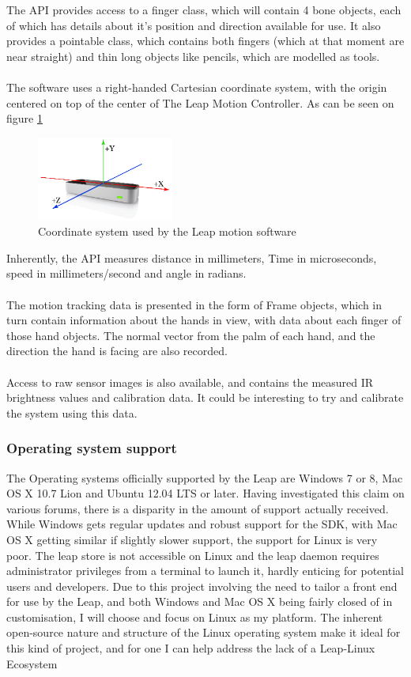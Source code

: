 \documentclass[a4paper]{article}
\begin{document}
The API provides access to a finger class, which will contain 4 bone objects, each of which has details about it's position and direction available for use. It also provides a pointable class, which contains both fingers (which at that moment are near straight) and thin long objects like pencils, which are modelled as tools. \\ \\
The software uses a right-handed Cartesian coordinate system, with the origin centered on top of the center of The Leap Motion Controller. As can be seen on figure \ref{coordinateSystem} 

\begin{figure}[!h]
\centerline{\includegraphics[width=0.4\textwidth]{Leap_Axes.png}}
\caption{Coordinate system used by the Leap motion software
\label{coordinateSystem}\cite{skeletalGuide}}
\end{figure}

Inherently, the API measures distance in millimeters, Time in microseconds, speed in millimeters/second and angle in radians. \\ \\

The motion tracking data is presented in the form of Frame objects, which in turn contain information about the hands in view, with data about each finger of those hand objects. The normal vector from the palm of each hand, and the direction the hand is facing are also recorded.\\ \\ Access to raw sensor images is also available, and contains the measured IR brightness values and calibration data. It could be interesting to try and calibrate the system using this data. 

\subsubsection{Operating system support}
The Operating systems officially supported by the Leap are Windows 7 or 8, Mac OS X 10.7 Lion and Ubuntu 12.04 LTS or later. Having investigated this claim on various forums, there is a disparity in the amount of support actually received. While Windows gets regular updates and robust support for the SDK, with Mac OS X getting similar if slightly slower support, the support for Linux is very poor. The leap store is not accessible on Linux and the leap daemon requires administrator privileges from a terminal to launch it, hardly enticing for potential users and developers. Due to this project involving the need to tailor a front end for use by the Leap, and both Windows and Mac OS X being fairly closed of in customisation, I will choose and focus on Linux as my platform. The inherent open-source nature and structure of the Linux operating system make it ideal for this kind of project, and for one I can help address the lack of a Leap-Linux Ecosystem
\end{document}
